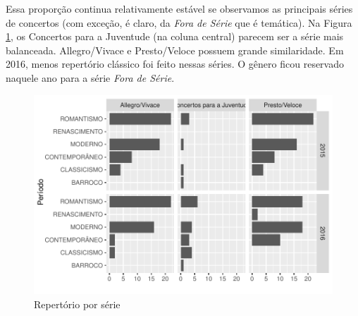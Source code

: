 \documentclass[a4paper, 12pt, openright, oneside, german, french, english, brazil]{abntex2}
\begin{document}
	Essa proporção continua relativamente estável se observamos as principais séries de concertos (com exceção, é claro, da \textit{Fora de Série} que é temática). Na Figura \ref{repertoire-perseries}, os Concertos para a Juventude (na coluna central) parecem ser a série mais balanceada. Allegro/Vivace e Presto/Veloce possuem grande similaridade. Em 2016, menos repertório clássico foi feito nessas séries. O gênero ficou reservado naquele ano para a série \textit{Fora de Série}.
	
	\begin{figure}[!h]
		\centering
		\caption{Repertório por série}
		\label{repertoire-perseries}
		\includegraphics[scale=1]{periodo_perserie_year.pdf}
	\end{figure}
	
	
	
\end{document}
